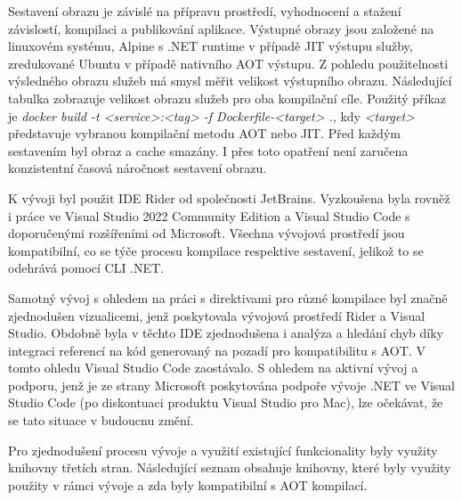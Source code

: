 Sestavení obrazu je závislé na přípravu prostředí, vyhodnocení a stažení závislostí, kompilaci a publikování aplikace. Výstupné obrazy jsou založené na linuxovém systému, Alpine s .NET runtime v případě JIT výstupu služby, zredukované Ubuntu v případě nativního AOT výstupu. Z pohledu použitelnosti výsledného obrazu služeb má smysl měřit velikost výstupního obrazu. Následující tabulka zobrazuje velikost obrazu služeb pro oba kompilační cíle. Použitý příkaz je \emph{docker build -t <service>:<tag> -f Dockerfile-<target> .}, kdy \emph{<target>} představuje vybranou kompilační metodu AOT nebo JIT. Před každým sestavením byl obraz a cache smazány. I přes toto opatření není zaručena konzistentní časová náročnost sestavení obrazu.



K vývoji byl použit IDE Rider od společnosti JetBrains. Vyzkoušena byla rovněž i práce ve Visual Studio 2022 Community Edition a Visual Studio Code s doporučenými rozšířeními od Microsoft. Všechna vývojová prostředí jsou kompatibilní, co se týče procesu kompilace respektive sestavení, jelikož to se odehrává pomocí CLI .NET.

Samotný vývoj s ohledem na práci s direktivami pro různé kompilace byl značně zjednodušen vizualicemi, jenž poskytovala vývojová prostředí Rider a Visual Studio. Obdobně byla v těchto IDE zjednodušena i analýza a hledání chyb díky integraci referencí na kód generovaný na pozadí pro kompatibilitu s AOT. V tomto ohledu Visual Studio Code zaostávalo. S ohledem na aktivní vývoj a podporu, jenž je ze strany Microsoft poskytována podpoře vývoje .NET ve Visual Studio Code (po diskontuaci produktu Visual Studio pro Mac), lze očekávat, že se tato situace v budoucnu změní.


Pro zjednodušení procesu vývoje a využití existující funkcionality byly využity knihovny třetích stran. Následující seznam obsahuje knihovny, které byly využity použity v rámci vývoje a zda byly kompatibilní s AOT kompilací.

